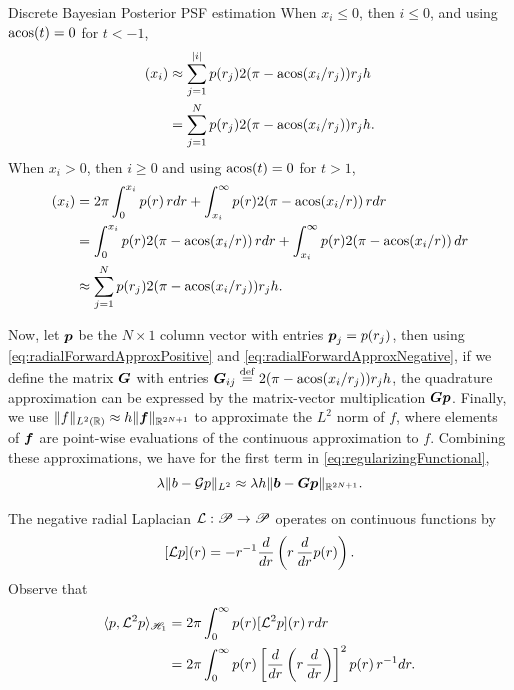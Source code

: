 \begin{chapter}{Discrete Bayesian Posterior PSF estimation}
When $x_i \le 0$, then $i \le 0$, and using $\operatorname*{acos}(t) = 0$ for $t<-1$,
\begin{align}
  [\G p](x_i) 
    &\approx \sum_{j=1}^{|i|} p(r_j)2(\pi - \acos(x_i/r_j)) r_jh \nonumber\\
    &= \sum_{j=1}^{N} p(r_j)2(\pi - \acos(x_i/r_j)) r_jh. \label{eq:radialForwardApproxPositive}
\end{align}
When $x_i > 0$, then $i \ge 0$ and using $\operatorname*{acos}(t) = 0$ for $t>1$,
\begin{align}
  [\G p](x_i) 
    &= 2\pi \int_0^{x_i} p(r)\,rdr + \int_{x_i}^\infty p(r)2(\pi - \acos(x_i/r))\,rdr\nonumber \\
    &= \int_0^{x_i} p(r) 2(\pi - \acos(x_i/r))\,rdr + \int_{x_i}^\infty p(r)2(\pi - \acos(x_i/r))\,dr\nonumber \\
    &\approx \sum_{j=1}^{N} p(r_j)2(\pi - \acos(x_i/r_j)) r_jh. \label{eq:radialForwardApproxNegative}
\end{align}

Now, let $\mbox{\boldmath$p$}$ be the $N\times 1$ column vector with entries $\mbox{\boldmath$p$}_j = p(r_j)$,
then using \eqref{eq:radialForwardApproxPositive} and \eqref{eq:radialForwardApproxNegative}, if we define the matrix $\mbox{\boldmath$G$}$ with entries $\mbox{\boldmath$G$}_{ij} \stackrel{\rm def}{=} 2(\pi - \operatorname*{acos}(x_i/r_j)) r_j h$, the quadrature approximation can be expressed by the matrix-vector multiplication $\mbox{\boldmath$G$} \mbox{\boldmath$p$}$.
Finally, we use $\|f\|_{L^2(\mathbb R)} \approx h\|\mbox{\boldmath$f$}\|_{\mathbb R^{2N+1}}$ to approximate the $L^2$ norm of $f$, where elements of $\mbox{\boldmath$f$}$ are point-wise evaluations of the continuous approximation to $f$.
Combining these approximations, we have for the first term in \eqref{eq:regularizingFunctional},
\begin{equation}
  \lambda \|b - \mathcal G p\|_{L^2} \approx \lambda h \|\mbox{\boldmath$b$} - \mbox{\boldmath$G$} \mbox{\boldmath$p$}\|_{\mathbb R^{2N+1}}.
\end{equation}

The negative radial Laplacian $\mathcal L: \mathscr P \to \mathscr P$ operates on continuous functions by
\begin{equation} \label{eq:radialLaplacian}
  [\mathcal L p](r) = -r^{-1}\frac{d}{dr}\left(r \,\frac{d}{dr}p(r)\right). 
\end{equation}
Observe that 
\begin{align} 
  \langle p, \mathcal L^2 p \rangle_{\mathscr H_1}
  &= 2\pi\int_0^\infty p(r) [\mathcal L^2 p](r) \, rdr \nonumber\\
  &= 2\pi\int_0^\infty p(r) \left[\frac{d}{dr}\left(r \,\frac{d}{dr}\right)\right]^2p(r) \, r^{-1}dr.
  \label{eq:infiniteRadialInnerProduct}
\end{align}


\end{chapter}
